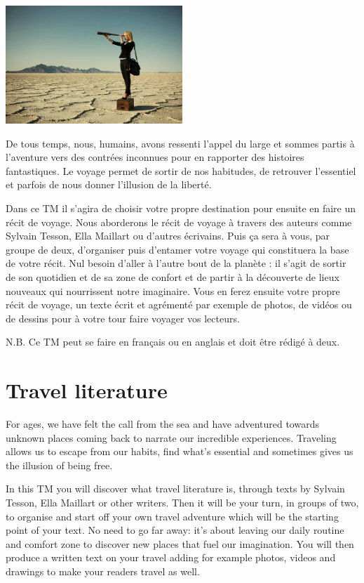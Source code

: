 \documentclass[
  10pt,
  french,
  a5paper,
  openany]{book}
\begin{document}
\begin{center}
\includegraphics[width=\textwidth,height=12em]{images/le-recit-de-voyage.jpg}

\end{center}

De tous temps, nous, humains, avons ressenti l'appel du large et sommes partis à l'aventure vers des contrées inconnues pour en rapporter des histoires fantastiques. Le voyage permet de sortir de nos habitudes, de retrouver l'essentiel et parfois de nous donner l'illusion de la liberté.

Dans ce TM il s'agira de choisir votre propre destination pour ensuite en faire un récit de voyage. Nous aborderons le récit de voyage à travers des auteurs comme Sylvain Tesson, Ella Maillart ou d'autres écrivains. Puis ça sera à vous, par groupe de deux, d'organiser puis d'entamer votre voyage qui constituera la base de votre récit. Nul besoin d'aller à l'autre bout de la planète : il s'agit de sortir de son quotidien et de sa zone de confort et de partir à la découverte de lieux nouveaux qui nourrissent notre imaginaire. Vous en ferez ensuite votre propre récit de voyage, un texte écrit et agrémenté par exemple de photos, de vidéos ou de dessins pour à votre tour faire voyager vos lecteurs.

N.B. Ce TM peut se faire en français ou en anglais et doit être rédigé à deux.

\hypertarget{travel-literature}{%
\section*{Travel literature}\label{travel-literature}}

For ages, we have felt the call from the sea and have adventured towards unknown places coming back to narrate our incredible experiences. Traveling allows us to escape from our habits, find what's essential and sometimes gives us the illusion of being free.

In this TM you will discover what travel literature is, through texts by Sylvain Tesson, Ella Maillart or other writers. Then it will be your turn, in groups of two, to organise and start off your own travel adventure which will be the starting point of your text. No need to go far away: it's about leaving our daily routine and comfort zone to discover new places that fuel our imagination. You will then produce a written text on your travel adding for example photos, videos and drawings to make your readers travel as well.
\end{document}
